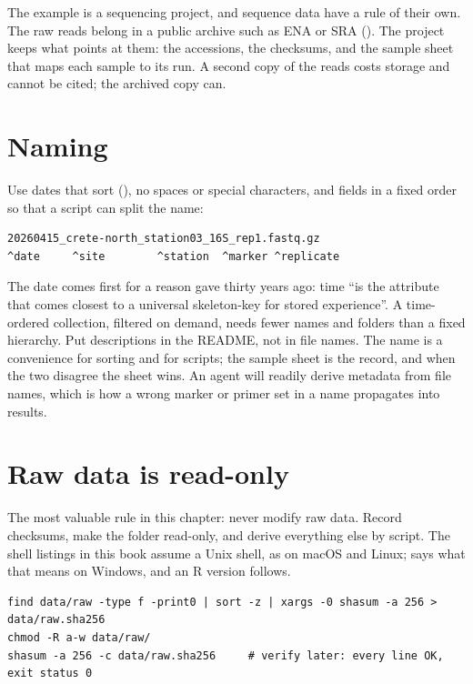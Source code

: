The example is a sequencing project, and sequence data have a rule of their
own. The raw reads belong in a public archive such as ENA or SRA
(). The project keeps what points at them: the
accessions, the checksums, and the sample sheet that maps each sample to its
run. A second copy of the reads costs storage and cannot be cited; the
archived copy can.

\section{Naming}

Use dates that sort (), no spaces or special characters, and
fields in a fixed order so that a script can split the name:

\begin{lstlisting}[style=shell]
20260415_crete-north_station03_16S_rep1.fastq.gz
^date     ^site        ^station  ^marker ^replicate
\end{lstlisting}

The date comes first for a reason \textcite{freeman1996lifestreams} gave
thirty years ago: time ``is the attribute that comes closest to a universal
skeleton-key for stored experience''. A time-ordered collection, filtered on
demand, needs fewer names and folders than a fixed hierarchy.
Put descriptions in the README, not in file names. The name is a convenience
for sorting and for scripts; the sample sheet is the record, and when the two
disagree the sheet wins. An agent will readily derive metadata from file
names, which is how a wrong marker or primer set in a name propagates into
results.

\section{Raw data is read-only}

The most valuable rule in this chapter: never modify raw data. Record
checksums, make the folder read-only, and derive everything else by script.
The shell listings in this book assume a Unix shell, as on macOS and Linux;
 says what that means on Windows, and an R version follows.

\begin{lstlisting}[style=shell,caption={Checksums first, then lock the folder}]
find data/raw -type f -print0 | sort -z | xargs -0 shasum -a 256 > data/raw.sha256
chmod -R a-w data/raw/
shasum -a 256 -c data/raw.sha256     # verify later: every line OK, exit status 0
\end{lstlisting}

